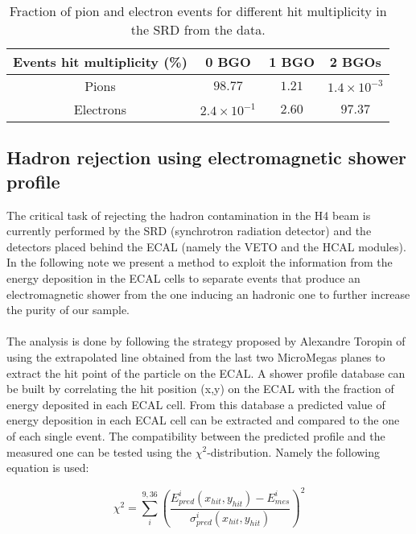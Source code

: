 \begin{table}[hbt!]
\begin{center}
\begin{tabular}{cccc}
Events hit multiplicity  (\%) & 0 BGO  & 1 BGO & 2 BGOs\\
\hline
Pions & $98.77$ & $1.21$ & $1.4\times10^{-3}$  \\
Electrons & $2.4\times10^{-1}$  & $2.60$ & $97.37$ \\
\end{tabular}
\end{center}
\caption[Fraction of pion and electron events for different hit multiplicity in the SRD from the data]{Fraction of pion and electron events for different hit multiplicity in the SRD from the data.}
\label{tab:hits}

\end{table}

\subsection{Hadron rejection using electromagnetic shower profile}
\label{ch3:sec:bkg-ecal-profile}

The critical task of rejecting the hadron contamination in the H4 beam
is currently performed by the SRD (synchrotron radiation detector) and
the detectors placed behind the ECAL (namely the VETO and the HCAL
modules). In the following note we present a method to exploit the
information from the energy deposition in the ECAL cells to separate
events that produce an electromagnetic shower from the one inducing an
hadronic one to further increase the purity of our sample.
\\
\\
The analysis is done by following the strategy proposed by Alexandre
Toropin of using the extrapolated line obtained from the last two
MicroMegas planes to extract the hit point of the particle on the
ECAL. A shower profile database can be built by correlating the hit
position (x,y) on the ECAL with the fraction of energy deposited in
each ECAL cell. From this database a predicted value of energy
deposition in each ECAL cell can be extracted and compared to the one
of each single event. The compatibility between the predicted profile
and the measured one can be tested using the
$\chi^2$-distribution. Namely the following equation is used:

\begin{equation}
  \chi^2 = \sum^{9,36}_i \left(\frac{E_{pred}^i(x_{hit},y_{hit})-E_{mes}^i}{\sigma^{i}_{pred}(x_{hit},y_{hit})}\right)^2
  \label{eqn:chi}
\end{equation}


